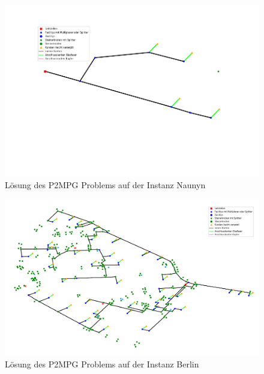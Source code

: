 \documentclass[11pt,a4paper]{article}
\theoremstyle{my_th_style1}
\begin{document}
\begin{figure}[!htbp]
	\begin{center}
		\begin{minipage}{8.0cm}
			\includegraphics[width=1\textwidth]{./Bilder/P2MPG_Naunyn_demand1_duration0}
			\caption{Lösung des P2MPG Problems auf der Instanz Naunyn}
			\label{p2mpg_n_pic}
		\end{minipage}
	\end{center}
\end{figure}

\begin{figure}[!htbp]
	\begin{center}
		\begin{minipage}{15.0cm}
			\includegraphics[width=1\textwidth]{./Bilder/P2MPG_Berlin_demand1_duration0}
			\caption{Lösung des P2MPG Problems auf der Instanz Berlin}
			\label{p2mpg_b_pic}
		\end{minipage}
	\end{center}
\end{figure}
\end{document}
